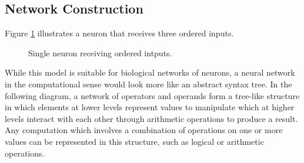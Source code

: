 \documentclass{article}
\begin{document}
\subsection{Network Construction}

 Figure \ref{fig:sig-neuron} illustrates a neuron that receives three ordered inputs. 

 
 \begin{figure}[!htb]

 \centering
 \caption{Single neuron receiving ordered intputs. \label{fig:sig-neuron}}
\end{figure}


While this model is suitable for biological networks of neurons, a neural network in the computational sense would look more like an abstract syntax tree. In the following diagram, a network of operators and operands form a tree-like structure in which elements at lower levels represent values to manipulate which at higher levels interact with each other through arithmetic operations to produce a result. Any computation which involves a combination of operations on one or more values can be represented in this structure, such as logical or arithmetic operations.
\end{document}
